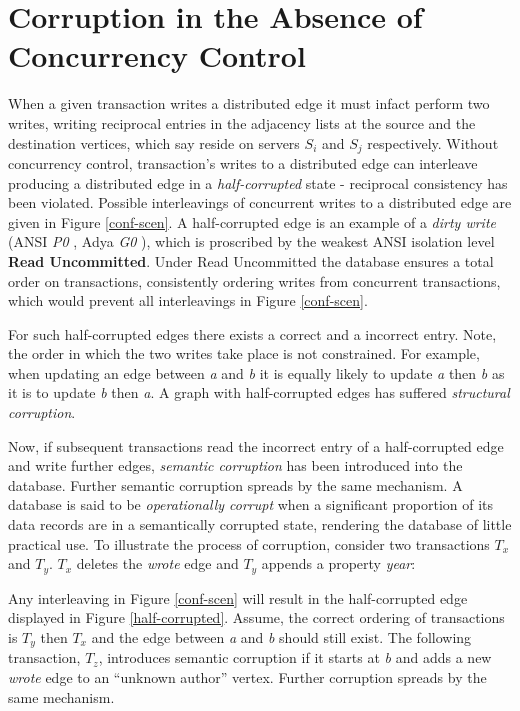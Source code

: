 \section{Corruption in the Absence of Concurrency Control}
\label{sec:db-corruption}

When a given transaction writes a distributed edge it must infact perform two writes, writing reciprocal entries in the adjacency lists at the source and the destination vertices, which say reside on servers $S_i$ and $S_j$ respectively. Without concurrency control, transaction's writes to a distributed edge can interleave producing a distributed edge in a \emph{half-corrupted} state - reciprocal consistency has been violated. Possible interleavings of concurrent writes to a distributed edge are given in Figure \ref{conf-scen}. A half-corrupted edge is an example of a \emph{dirty write} (ANSI \emph{P0} \cite{Berenson1995}, Adya \emph{G0} \cite{Adya2000}), which is proscribed by the weakest ANSI isolation level \textbf{Read Uncommitted}. Under Read Uncommitted the database ensures a total order on transactions, consistently ordering writes from concurrent transactions, which would prevent all interleavings in Figure \ref{conf-scen}.

For such half-corrupted edges there exists a correct and a incorrect entry. Note, the order in which the two writes take place is not constrained. For example, when updating an edge between \emph{a} and \emph{b} it is equally likely to update \emph{a} then \emph{b} as it is to update \emph{b} then \emph{a}. A graph with half-corrupted edges has suffered \emph{structural corruption}.

Now, if subsequent transactions read the incorrect entry of a half-corrupted edge and write further edges, \emph{semantic corruption} has been introduced into the database. Further semantic corruption spreads by the same mechanism. A database is said to be \emph{operationally corrupt} when a significant proportion of its data records are in a semantically corrupted state, rendering the database of little practical use. To illustrate the process of corruption, consider two transactions $T_x$ and $T_y$. $T_x$ deletes the \emph{wrote} edge and $T_y$ appends a property \emph{year}:

Any interleaving in Figure \ref{conf-scen} will result in the half-corrupted edge displayed in Figure \ref{half-corrupted}. Assume, the correct ordering of transactions is $T_y$ then $T_x$ and the edge between \emph{a} and \emph{b} should still exist. The following transaction, $T_z$, introduces semantic corruption if it starts at \emph{b} and adds a new \emph{wrote} edge to an ``unknown author'' vertex. Further corruption spreads by the same mechanism.


